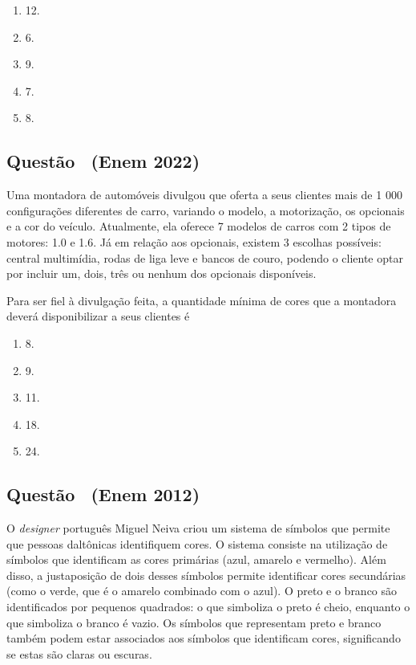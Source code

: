 \documentclass[12pt]{article}
\newcounter{questao}
\newcommand{\novaquestao}[1]{%
	\stepcounter{questao}%
	\subsection*{Questão \thequestao\ (#1)}%
}
\begin{document}
\begin{multicols}{2}
                \begin{enumerate}[label=(\alph*), noitemsep]
	                \item 12.
	                \item 6.
	                \item 9.
	                \item 7.
	                \item 8.
                \end{enumerate}

            \novaquestao{Enem 2022}

            Uma montadora de automóveis divulgou que oferta a seus clientes mais de 1 000 configurações diferentes de carro, variando o modelo, a motorização, os opcionais e a cor do veículo. Atualmente, ela oferece 7 modelos de carros com 2 tipos de motores: 1.0 e 1.6. Já em relação aos opcionais, existem 3 escolhas possíveis: central multimídia, rodas de liga leve e bancos de couro, podendo o cliente optar por incluir um, dois, três ou nenhum dos opcionais disponíveis.

            Para ser fiel à divulgação feita, a quantidade mínima de cores que a montadora deverá disponibilizar a seus clientes é

                \begin{enumerate}[label=(\alph*), noitemsep]
	                \item 8.
	                \item 9.
	                \item 11.
	                \item 18.
	                \item 24.
                \end{enumerate}

            \novaquestao{Enem 2012}

            O \textit{designer} português Miguel Neiva criou um sistema de símbolos que permite que pessoas daltônicas identifiquem cores.  O sistema consiste na utilização de símbolos que identificam as cores primárias (azul, amarelo e vermelho). Além disso, a justaposição de dois desses símbolos permite identificar cores secundárias (como o verde, que é o amarelo combinado com o azul). O preto e o branco são identificados por pequenos quadrados: o que simboliza o preto é cheio, enquanto o que simboliza o branco é vazio. Os símbolos que representam preto e branco também podem estar associados aos símbolos que identificam cores, significando se estas são claras ou escuras.
               

\end{multicols}
\end{document}
